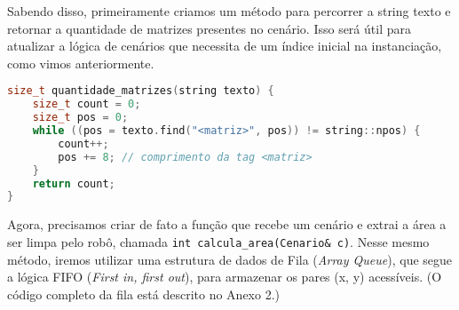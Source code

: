 Sabendo disso, primeiramente criamos um método para percorrer a string texto e retornar a quantidade de matrizes presentes no cenário. Isso será útil para atualizar a lógica de cenários que necessita de um índice inicial na instanciação, como vimos anteriormente.
\begin{lstlisting}[language=c++]
size_t quantidade_matrizes(string texto) {
    size_t count = 0;
    size_t pos = 0;
    while ((pos = texto.find("<matriz>", pos)) != string::npos) {
        count++;
        pos += 8; // comprimento da tag <matriz>
    }
    return count;
}
\end{lstlisting}

Agora, precisamos criar de fato a função que recebe um cenário e extrai a área a ser limpa pelo robô, chamada \texttt{int calcula\_area(Cenario\& c)}. Nesse mesmo método, iremos utilizar uma estrutura de dados de Fila (\textit{Array Queue}), que segue a lógica FIFO (\textit{First in, first out}), para armazenar os pares (x, y) acessíveis. (O código completo da fila está descrito no Anexo 2.)
